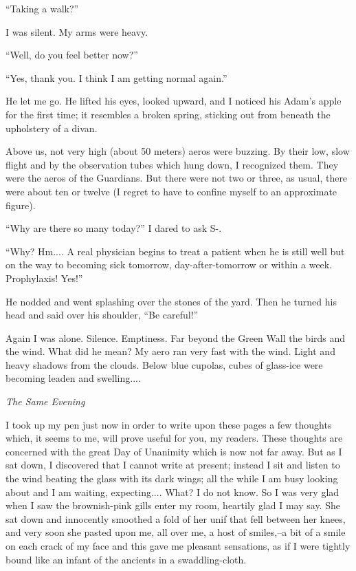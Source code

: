 \documentclass[11pt,openany]{book}
\begin{document}
``Taking a walk?''

I was silent. My arms were heavy.

``Well, do you feel better now?''

``Yes, thank you. I think I am getting normal again.''

He let me go. He lifted his eyes, looked upward, and I noticed his Adam's apple for the first time; it resembles a broken spring, sticking out from beneath the upholstery of a divan.

Above us, not very high (about 50 meters) aeros were buzzing. By their low, slow flight and by the observation tubes which hung down, I recognized them. They were the aeros of the Guardians. But there were not two or three, as usual, there were about ten or twelve (I regret to have to confine myself to an approximate figure).

``Why are there so many today?'' I dared to ask S-.

``Why? Hm.... A real physician begins to treat a patient when he is still well but on the way to becoming sick tomorrow, day-after-tomorrow or within a week. Prophylaxis! Yes!''

He nodded and went splashing over the stones of the yard. Then he turned his head and said over his shoulder, ``Be careful!''

Again I was alone. Silence. Emptiness. Far beyond the Green Wall the birds and the wind. What did he mean? My aero ran very fast with the wind. Light and heavy shadows from the clouds. Below blue cupolas, cubes of glass-ice were becoming leaden and swelling....

\emph{The Same Evening}

I took up my pen just now in order to write upon these pages a few thoughts which, it seems to me, will prove useful for you, my readers. These thoughts are concerned with the great Day of Unanimity which is now not far away. But as I sat down, I discovered that I cannot write at present; instead I sit and listen to the wind beating the glass with its dark wings; all the while I am busy looking about and I am waiting, expecting.... What? I do not know. So I was very glad when I saw the brownish-pink gills enter my room, heartily glad I may say. She sat down and innocently smoothed a fold of her unif that fell between her knees, and very soon she pasted upon me, all over me, a host of smiles,--a bit of a smile on each crack of my face and this gave me pleasant sensations, as if I were tightly bound like an infant of the ancients in a swaddling-cloth.
\end{document}
